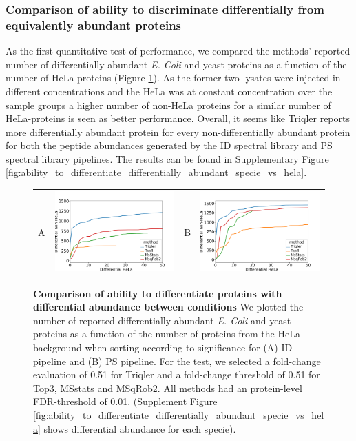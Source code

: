 \documentclass[10pt,letterpaper]{article}
\begin{document}
\subsubsection*{Comparison of ability to discriminate differentially from equivalently abundant proteins}

As the first quantitative test of performance, we compared the methods' reported number of differentially abundant {\em E. Coli} and yeast proteins as a function of the number of HeLa proteins (Figure \ref{fig:diff_vs_hela}). As the former two lysates were injected in different concentrations and the HeLa was at constant concentration over the sample groups a higher number of non-HeLa proteins for a similar number of HeLa-proteins is seen as better performance.  Overall, it seems like Triqler reports more differentially abundant protein for every non-differentially abundant protein for both the peptide abundances generated by the ID spectral library and PS spectral library pipelines. The results can be found in Supplementary Figure \ref{fig:ability_to_differentiate_differentially_abundant_specie_vs_hela}. 

\begin{figure}[hbt]
    \centering
    \begin{tabular}{lclc} 
        A & \includegraphics[width=0.45\linewidth]{../../result/report_plots_pipeline/diff_HeLa_vs_nonHeLa_ID_all_0.51.png} & 
        B & \includegraphics[width=0.45\linewidth]{../../result/report_plots_pipeline/diff_HeLa_vs_nonHeLa_PS_all_0.51.png} \\
    \end{tabular} 
    \caption{{\bf Comparison of ability to differentiate proteins with differential abundance between conditions} We plotted the number of reported differentially abundant  {\em E. Coli} and yeast proteins as a function of the number of proteins from the HeLa background when sorting according to significance for (A) ID pipeline and (B) PS pipeline. For the test, we selected a fold-change evaluation of 0.51 for Triqler and a fold-change threshold of 0.51 for Top3, MSstats and MSqRob2. All methods had an protein-level FDR-threshold of 0.01. (Supplement Figure \ref{fig:ability_to_differentiate_differentially_abundant_specie_vs_hela} shows differential abundance for each specie). \label{fig:diff_vs_hela}}
\end{figure}
\end{document}
